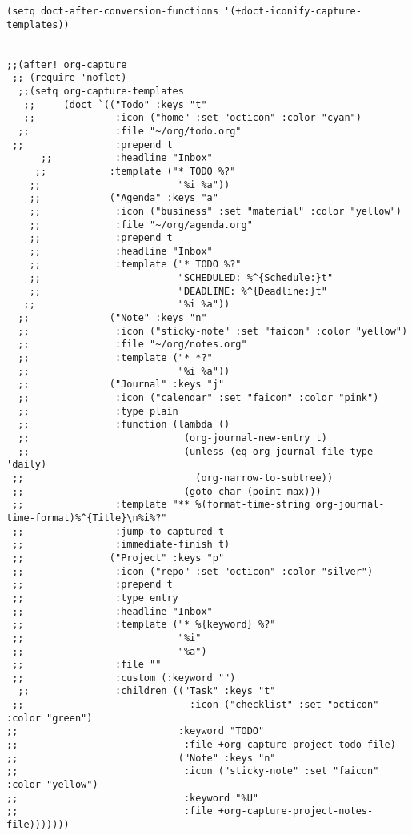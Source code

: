 \documentclass[11pt]{article}
\begin{document}
\begin{verbatim}
(setq doct-after-conversion-functions '(+doct-iconify-capture-templates))


;;(after! org-capture
 ;; (require 'noflet)
  ;;(setq org-capture-templates
   ;;     (doct `(("Todo" :keys "t"
   ;;              :icon ("home" :set "octicon" :color "cyan")
  ;;               :file "~/org/todo.org"
 ;;                :prepend t
      ;;           :headline "Inbox"
     ;;           :template ("* TODO %?"
    ;;                        "%i %a"))
    ;;            ("Agenda" :keys "a"
    ;;             :icon ("business" :set "material" :color "yellow")
    ;;             :file "~/org/agenda.org"
    ;;             :prepend t
    ;;             :headline "Inbox"
    ;;             :template ("* TODO %?"
    ;;                        "SCHEDULED: %^{Schedule:}t"
    ;;                        "DEADLINE: %^{Deadline:}t"
   ;;                         "%i %a"))
  ;;              ("Note" :keys "n"
  ;;               :icon ("sticky-note" :set "faicon" :color "yellow")
  ;;               :file "~/org/notes.org"
  ;;               :template ("* *?"
  ;;                          "%i %a"))
  ;;              ("Journal" :keys "j"
  ;;               :icon ("calendar" :set "faicon" :color "pink")
  ;;               :type plain
  ;;               :function (lambda ()
  ;;                           (org-journal-new-entry t)
  ;;                           (unless (eq org-journal-file-type 'daily)
 ;;                              (org-narrow-to-subtree))
 ;;                            (goto-char (point-max)))
 ;;                :template "** %(format-time-string org-journal-time-format)%^{Title}\n%i%?"
 ;;                :jump-to-captured t
 ;;                :immediate-finish t)
 ;;               ("Project" :keys "p"
 ;;                :icon ("repo" :set "octicon" :color "silver")
 ;;                :prepend t
 ;;                :type entry
 ;;                :headline "Inbox"
 ;;                :template ("* %{keyword} %?"
 ;;                           "%i"
 ;;                           "%a")
 ;;                :file ""
 ;;                :custom (:keyword "")
  ;;               :children (("Task" :keys "t"
 ;;                             :icon ("checklist" :set "octicon" :color "green")
;;                            :keyword "TODO"
;;                             :file +org-capture-project-todo-file)
;;                            ("Note" :keys "n"
;;                             :icon ("sticky-note" :set "faicon" :color "yellow")
;;                             :keyword "%U"
;;                             :file +org-capture-project-notes-file)))))))
\end{verbatim}
\end{document}
